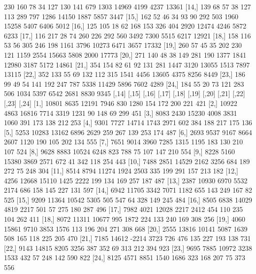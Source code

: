 \documentclass[a4paper]{ article}
\begin{document}
\begin{table}[H]
\begin{Schunk}
\begin{Soutput}
[13,]  230  160   78   34  127  130  141  679 1303 14969  4199  4237 13361
[14,]  139   68   57   38  127  113  289  797 1286 14150  1887  5857  3447
[15,]  162   52   46   34   93   90  292  503 1960 15258  5407  6406  5012
[16,]  125  105   18   62  168  153  326  404 2920 12474  4246  5872  6233
[17,]  116  217   28   74  260  226  292  560 3492  7300  5515  6217 12921
[18,]  158  116   53   56  305  246  198 1161 3796 10273  6471  3657 17332
[19,]  260   57   45   35  202  230  121 1159 2554 15663  5808  2000 17773
[20,]  271  140   48   38  149  281  190 1377 1841 12980  3187  5172 14861
[21,]  354  154   82   61   92  131  281 1447 3120 13055  1513  7897 13115
[22,]  352  133   55   69  132  112  315 1541 4456 13605  4375  8256  8449
[23,]  186   99   49   54  141  192  247  787 5338 11429  5896  7602  4289
[24,]  184   55   20   73  121  283  506 1034 5397  6542  2681  8830  9345
      [,14] [,15] [,16] [,17] [,18] [,19] [,20] [,21] [,22] [,23] [,24]
 [1,] 10801  8635 12191  7946   830  1280   154   172   200   221   421
 [2,] 10922  4863 16816  7714  3319  1231    90   148    69   299   451
 [3,]  8083  2430 15230  4008  3831  1060   391   173   138   212   253
 [4,]  9301  7727 14714  1743  2971   602   384   188   217   175   136
 [5,]  5253 10283 13162  6896  2629   259   267   139   253   174   487
 [6,]  2693  9537  9167  8664  2607  1120   190   105   202   134   555
 [7,]  7651  9014  3960  7285  1315  1195   183   130   210   107   524
 [8,]  9628  8883 10524  6248   823   788    75   107   147   210   554
 [9,]  8228  5160 15380  3869  2571   672    41   342   118   254   443
[10,]  7488  2851 14529  2162  3256   684   189   272    75   248   304
[11,]  8514  8794 11274  1924  2503   335   199   291   157   213   182
[12,]  4256 12668 15110  1425  2222   199   134   169   257   187   487
[13,]  2387 10930  6970  5532  2174   686   158   145   227   131   597
[14,]  6942 11705  3342  7071  1182   655   143   249   167    82   525
[15,]  9209 11364 10542  5305   505   547    64   328   149   245   484
[16,]  8505  6838 14029  4819  2217   501    57   275   180   287   496
[17,]  7982  4021 12028  2217  2412   454   110   235   104   262   411
[18,]  8072 11311 10677   995  1872   224   133   240   169   308   256
[19,]  4060 15861  9710  3853  1576   113   196   204   271   308   668
[20,]  2555 13816 10141  5087  1639   508   165   118   225   205   470
[21,]  7185 14612 -2214  3723   726   476   135   227   193   138   731
[22,]  9143 14815  8205  3256   387   352    69   313   212   394   923
[23,]  9695  7885 10972  3238  1533   432    57   248   142   590   822
[24,]  8125  4571  8851  1540  1686   323   168   207    75   373   556
\end{Soutput}
\end{Schunk}
\end{table}
\end{document}
